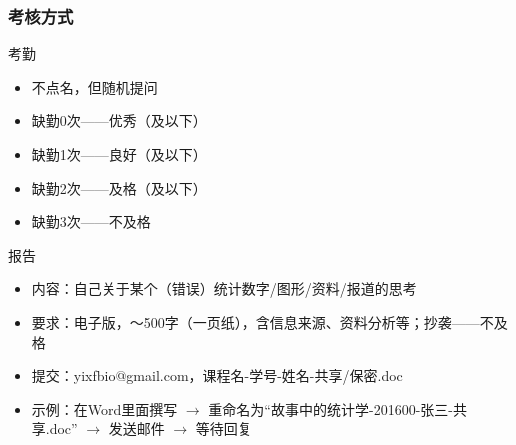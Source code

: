 \begin{frame}
  \frametitle{\alert{考核方式}}
  \begin{block}{考勤}
    \begin{itemize}
      \item 不点名，但随机提问
      \item 缺勤0次——优秀（及以下）
      \item 缺勤1次——良好（及以下）
      \item 缺勤2次——及格（及以下）
      \item \alert{缺勤3次——不及格}
    \end{itemize}
  \end{block}
  \pause
  \begin{block}{报告}
    \begin{itemize}
      \item 内容：自己关于某个（错误）统计数字/图形/资料/报道的思考
      \item 要求：电子版，～500字（一页纸），含信息来源、资料分析等；\alert{抄袭——不及格}
      \item 提交：yixfbio@gmail.com，课程名-学号-姓名-共享/保密.doc
      \item 示例：在Word里面撰写 $\rightarrow$ 重命名为“故事中的统计学-201600-张三-共享.doc” $\rightarrow$ 发送邮件 $\rightarrow$ 等待回复
    \end{itemize}
  \end{block}
\end{frame}

